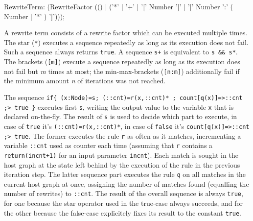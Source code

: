 \begin{rail}
  RewriteTerm: 
    (RewriteFactor (() | ('*' | '+' | '[' Number ']' | '[' Number ':' ( Number | '*' ) ']')));
\end{rail}

A rewrite term consists of a rewrite factor which can be executed multiple times.
The star (\texttt{*}) executes a sequence repeatedly as long as its execution does not fail. 
Such a sequence always returns \texttt{true}.
A sequence \verb#s+# is equivalent to \verb#s && s*#.
The brackets (\texttt{[m]}) execute a sequence repeatedly as long as its execution does not fail but \emph{m} times at most;
the min-max-brackets (\texttt{[n:m]}) additionally fail if the minimum amount \emph{n} of iterations was not reached.

\begin{example}
The sequence \verb#if{ (x:Node)=s; (::cnt)=r(x,::cnt)* ; count[q(x)]=>::cnt ;> true }# 
executes first \texttt{s}, writing the output value to the variable \texttt{x} that is declared on-the-fly.
The result of \texttt{s} is used to decide which part to execute, in case of \texttt{true} it's \verb#(::cnt)=r(x,::cnt)*#,
in case of \texttt{false} it's \verb#count[q(x)]=>::cnt ;> true#.
The former executes the rule \texttt{r} as often as it matches, incrementing a variable \texttt{::cnt} used as counter each time (assuming that \texttt{r} contains a \verb#return(incnt+1)# for an input parameter \texttt{incnt}).
Each match is sought in the host graph at the state left behind by the execution of the rule in the previous iteration step.
The latter sequence part executes the rule \texttt{q} on all matches in the current host graph at once, assigning the number of matches found (equalling the number of rewrites) to \texttt{::cnt}.
The result of the overall sequence is always \texttt{true}, for one because the star operator used in the true-case always succeeds, and for the other because the false-case explicitely fixes its result to the constant \texttt{true}.
\end{example}

